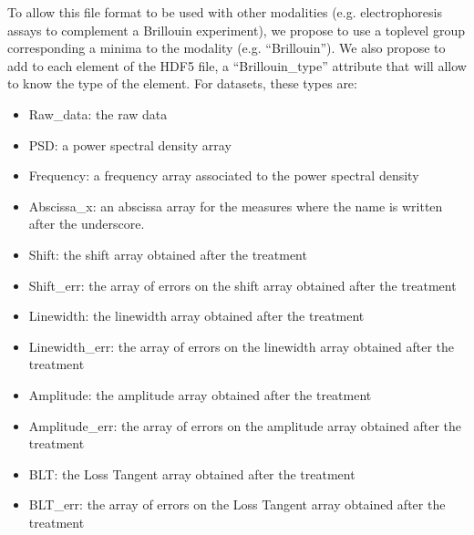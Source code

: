 \documentclass[letterpaper,10pt,english]{sphinxmanual}
\begin{document}
\sphinxAtStartPar
To allow this file format to be used with other modalities (e.g. electrophoresis assays to complement a Brillouin experiment), we propose to use a top\sphinxhyphen{}level group corresponding a minima to the modality (e.g. “Brillouin”). We also propose to add to each element of the HDF5 file, a “Brillouin\_type” attribute that will allow to know the type of the element. For datasets, these types are:
\begin{itemize}
\item {} 
\sphinxAtStartPar
Raw\_data: the raw data

\item {} 
\sphinxAtStartPar
PSD: a power spectral density array

\item {} 
\sphinxAtStartPar
Frequency: a frequency array associated to the power spectral density

\item {} 
\sphinxAtStartPar
Abscissa\_x: an abscissa array for the measures where the name is written after the underscore.

\item {} 
\sphinxAtStartPar
Shift: the shift array obtained after the treatment

\item {} 
\sphinxAtStartPar
Shift\_err: the array of errors on the shift array obtained after the treatment

\item {} 
\sphinxAtStartPar
Linewidth: the linewidth array obtained after the treatment

\item {} 
\sphinxAtStartPar
Linewidth\_err: the array of errors on the linewidth array obtained after the treatment

\item {} 
\sphinxAtStartPar
Amplitude: the amplitude array obtained after the treatment

\item {} 
\sphinxAtStartPar
Amplitude\_err: the array of errors on the amplitude array obtained after the treatment

\item {} 
\sphinxAtStartPar
BLT: the Loss Tangent array obtained after the treatment

\item {} 
\sphinxAtStartPar
BLT\_err: the array of errors on the Loss Tangent array obtained after the treatment

\end{itemize}
\end{document}
